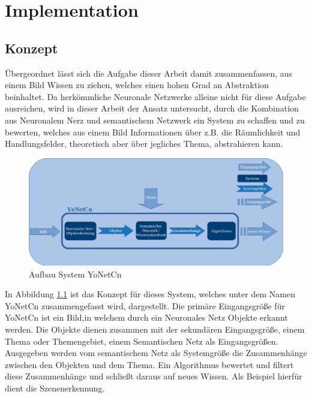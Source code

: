 \chapter{Implementation}
\label{sec:implementation}

\section{Konzept}
\label{sec:Lösung}

Übergeordnet lässt sich die Aufgabe dieser Arbeit damit zusammenfassen, aus einem Bild Wissen zu ziehen, welches einen hohen Grad an Abstraktion beinhaltet. Da herkömmliche Neuronale Netzwerke alleine nicht für diese Aufgabe ausreichen, wird in dieser Arbeit der Ansatz untersucht, durch die Kombination aus Neuronalem Nerz und semantischem Netzwerk ein System zu schaffen und zu bewerten, welches aus einem Bild Informationen über z.B. die Räumlichkeit und Handlungsfelder, theoretisch aber über jegliches Thema, abstrahieren kann. 


\begin{figure}[h]
	
	\begin{center}
		
		\includegraphics[width=14cm]{images/Masteridee.png}
		
		\caption{Aufbau System YoNetCn}
		
		\label{system_Bild}
		
	\end{center}
	
	
\end{figure}


In Abbildung \ref{system_Bild} ist das Konzept für dieses System, welches unter dem Namen YoNetCn zusammengefasst wird, dargestellt. Die primäre Eingangsgröße für YoNetCn ist ein Bild,in welchem durch ein Neuronales Netz Objekte erkannt werden. Die Objekte dienen zusammen mit der sekundären Eingangsgröße, einem Thema oder Themengebiet, einem Semantischen Netz als Eingangsgrößen. Ausgegeben werden vom semantischem Netz als Systemgröße die Zusammenhänge zwischen den Objekten und dem Thema. Ein Algorithmus bewertet und filtert diese Zusammenhänge und schließt daraus auf neues Wissen. Als Beispiel hierfür dient die Szenenerkennung. 



